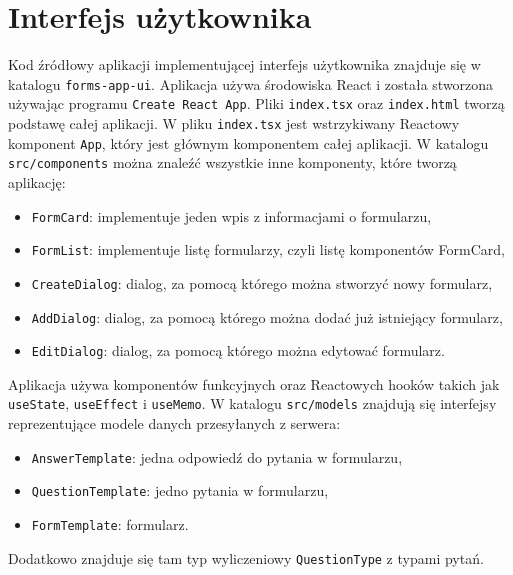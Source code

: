 \section{Interfejs użytkownika}
Kod źródłowy aplikacji implementującej interfejs użytkownika znajduje się w katalogu
\texttt{forms-app-ui}. Aplikacja używa środowiska React i została stworzona używając programu
\texttt{Create React App}. Pliki \texttt{index.tsx} oraz \texttt{index.html}
tworzą podstawę całej aplikacji. W pliku \texttt{index.tsx} jest wstrzykiwany Reactowy
komponent \texttt{App}, który jest głównym komponentem całej aplikacji. W katalogu 
\texttt{src/components} można znaleźć wszystkie inne komponenty, które tworzą aplikację:
\begin{itemize}
  \item \texttt{FormCard}: implementuje jeden wpis z informacjami o formularzu,
  \item \texttt{FormList}: implementuje listę formularzy, czyli listę komponentów FormCard,
  \item \texttt{CreateDialog}: dialog, za pomocą którego można stworzyć nowy formularz,
  \item \texttt{AddDialog}: dialog, za pomocą którego można dodać już istniejący formularz,
  \item \texttt{EditDialog}: dialog, za pomocą którego można edytować formularz.
\end{itemize}
Aplikacja używa komponentów funkcyjnych oraz Reactowych hooków takich jak \texttt{useState},
\texttt{useEffect} i \texttt{useMemo}. W katalogu \texttt{src/models} znajdują się interfejsy
reprezentujące modele danych przesyłanych z serwera:
\begin{itemize}
  \item \texttt{AnswerTemplate}: jedna odpowiedź do pytania w formularzu,
  \item \texttt{QuestionTemplate}: jedno pytania w formularzu,
  \item \texttt{FormTemplate}: formularz.
\end{itemize}
Dodatkowo znajduje się tam typ wyliczeniowy \texttt{QuestionType} z typami pytań.

